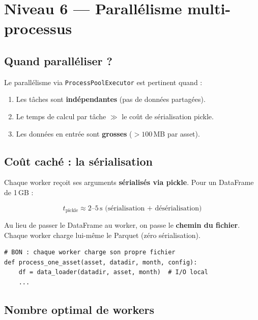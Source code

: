 \documentclass[11pt, a4paper]{article}
\begin{document}
\section{Niveau 6 --- Parall\'elisme multi-processus}

\subsection{Quand parall\'eliser ?}

Le parall\'elisme via \texttt{ProcessPoolExecutor} est pertinent quand :
\begin{enumerate}
    \item Les t\^aches sont \textbf{ind\'ependantes} (pas de donn\'ees partag\'ees).
    \item Le temps de calcul par t\^ache $\gg$ le co\^ut de s\'erialisation pickle.
    \item Les donn\'ees en entr\'ee sont \textbf{grosses} ($> 100$\,MB par asset).
\end{enumerate}

\subsection{Co\^ut cach\'e : la s\'erialisation}

Chaque worker re\c{c}oit ses arguments \textbf{s\'erialis\'es via pickle}.
Pour un DataFrame de 1\,GB :

\begin{equation}
    t_{\text{pickle}} \approx 2\text{--}5\,\text{s (s\'erialisation + d\'es\'erialisation)}
\end{equation}

\begin{tipbox}
Au lieu de passer le DataFrame au worker, on passe le \textbf{chemin du fichier}.
Chaque worker charge lui-m\^eme le Parquet (z\'ero s\'erialisation).

\begin{lstlisting}
# BON : chaque worker charge son propre fichier
def process_one_asset(asset, datadir, month, config):
    df = data_loader(datadir, asset, month)  # I/O local
    ...
\end{lstlisting}
\end{tipbox}

\subsection{Nombre optimal de workers}
\end{document}
